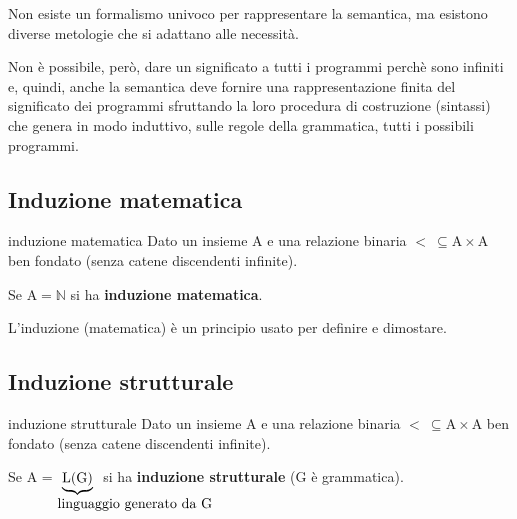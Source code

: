 Non esiste un formalismo univoco per rappresentare la semantica, ma esistono diverse metologie che si adattano alle necessità.

\medskip
Non è possibile, però, dare un significato a tutti i programmi perchè sono infiniti e, quindi, anche la semantica deve fornire una rappresentazione finita del significato dei programmi sfruttando la loro procedura di costruzione (sintassi) che genera in modo induttivo, sulle regole della grammatica, tutti i possibili programmi.

\subsection{Induzione matematica}
\begin{mydef}{induzione matematica}
    Dato un insieme $\mathrm{A}$ e una relazione binaria $\mathrm{< \ \subseteq A \times A}$ ben fondato (senza catene discendenti infinite).

    Se $\mathrm{A = \mathbb{N}}$ si ha \textbf{induzione matematica}.
\end{mydef}

L'induzione (matematica) è un principio usato per definire e dimostare.


\subsection{Induzione strutturale}
\begin{mydef}{induzione strutturale}
    Dato un insieme $\mathrm{A}$ e una relazione binaria $\mathrm{< \ \subseteq A \times A}$ ben fondato (senza catene discendenti infinite).

    Se $\mathrm{A}$ = $\underbrace{\mathrm{L(G)}}_{\parbox{1cm}{\text{linguaggio generato da G}}}$ si ha \textbf{induzione strutturale} ($\mathrm{G}$ è grammatica).
\end{mydef}

